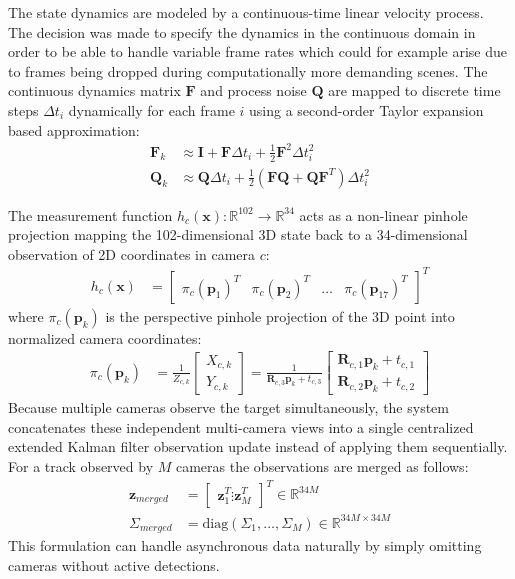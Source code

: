 The state dynamics are modeled by a continuous-time linear velocity process. The decision was made to specify the dynamics in the continuous domain in order to be able to handle variable frame rates which could for example arise due to frames being dropped during computationally more demanding scenes. The continuous dynamics matrix $\mathbf{F}$ and process noise $\mathbf{Q}$ are mapped to discrete time steps $\Delta t_i$ dynamically for each frame $i$ using a second-order Taylor expansion based approximation:
\begin{align*}
    \mathbf{F}_k &\approx \mathbf{I} + \mathbf{F} \Delta t_i + \frac{1}{2} \mathbf{F}^2 \Delta t_i^2 \\
    \mathbf{Q}_k &\approx \mathbf{Q} \Delta t_i + \frac{1}{2} (\mathbf{F} \mathbf{Q} + \mathbf{Q} \mathbf{F}^T) \Delta t_i^2
\end{align*}

The measurement function $h_c(\mathbf{x}): \mathbb{R}^{102} \to \mathbb{R}^{34}$ acts as a non-linear pinhole projection mapping the 102-dimensional 3D state back to a 34-dimensional observation of 2D coordinates in camera $c$:
\begin{align*}
    h_c(\mathbf{x}) &= \begin{bmatrix} \pi_c(\mathbf{p}_1)^T & \pi_c(\mathbf{p}_2)^T & \dots & \pi_c(\mathbf{p}_{17})^T \end{bmatrix}^T
\end{align*}
where $\pi_c(\mathbf{p}_k)$ is the perspective pinhole projection of the 3D point into normalized camera coordinates:
\begin{align*}
    \pi_c(\mathbf{p}_k) &= \frac{1}{Z_{c,k}} \begin{bmatrix} X_{c,k} \\ Y_{c,k} \end{bmatrix} = \frac{1}{\mathbf{R}_{c,3} \mathbf{p}_k + t_{c,3}} \begin{bmatrix} \mathbf{R}_{c,1} \mathbf{p}_k + t_{c,1} \\ \mathbf{R}_{c,2} \mathbf{p}_k + t_{c,2} \end{bmatrix}
\end{align*}
Because multiple cameras observe the target simultaneously, the system concatenates these independent multi-camera views into a single centralized extended Kalman filter observation update instead of applying them sequentially. For a track observed by $M$ cameras the observations are merged as follows:
\begin{align*}
    \mathbf{z}_{merged} &= \begin{bmatrix} \mathbf{z}_1^T \vdots \mathbf{z}_M^T \end{bmatrix}^T \in \mathbb{R}^{34M} \\
    \Sigma_{merged} &= \text{diag}(\Sigma_1, \dots, \Sigma_M) \in \mathbb{R}^{34M \times 34M}
\end{align*}
This formulation can handle asynchronous data naturally by simply omitting cameras without active detections.

